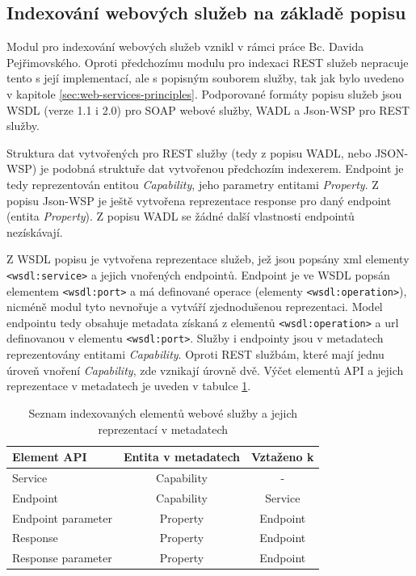 \documentclass[czech,DP]{thesiskiv}
\begin{document}
\subsection{Indexování webových služeb na základě popisu}

Modul pro indexování webových služeb vznikl v rámci práce Bc. Davida Pejřimovského. Oproti předchozímu modulu pro indexaci REST služeb nepracuje tento s její implementací, ale s popisným souborem služby, tak jak bylo uvedeno v kapitole \ref{sec:web-services-principles}. Podporované formáty popisu služeb jsou WSDL (verze 1.1 i 2.0) pro SOAP webové služby, WADL a Json-WSP pro REST služby\cite{pejrimovsky2015ws}.

Struktura dat vytvořených pro REST služby (tedy z popisu WADL, nebo JSON-WSP) je podobná struktuře dat vytvořenou předchozím indexerem. Endpoint je tedy reprezentován entitou \textit{Capability}, jeho parametry entitami \textit{Property}. Z popisu Json-WSP je ještě vytvořena reprezentace response pro daný endpoint (entita \textit{Property}). Z popisu WADL se žádné další vlastnosti endpointů nezískávají.

Z WSDL popisu je vytvořena reprezentace služeb, jež jsou popsány xml elementy \verb|<wsdl:service>| a jejich vnořených endpointů. Endpoint je ve WSDL popsán elementem \verb|<wsdl:port>| a má definované operace (elementy \verb|<wsdl:operation>|), nicméně modul tyto nevnořuje a vytváří zjednodušenou reprezentaci. Model endpointu tedy obsahuje metadata získaná z elementů \verb|<wsdl:operation>| a url definovanou v elementu \verb|<wsdl:port>|. Služby i endpointy jsou v metadatech reprezentovány entitami \textit{Capability}. Oproti REST službám, které mají jednu úroveň vnoření \textit{Capability}, zde vznikají úrovně dvě. Výčet elementů API a jejich reprezentace v metadatech je uveden v tabulce \ref{tab:ws-indexed}.

\begin{table}[h]
	\centering
	\begin{tabular}{|l | c | c |}
		\hline
		Element API & Entita v metadatech & Vztaženo k \\
		\hline
		\hline
		Service & Capability & - \\
		\hline
		Endpoint & Capability & Service \\
		\hline
		Endpoint parameter & Property & Endpoint \\
		\hline
		Response & Property & Endpoint \\
		\hline
		Response parameter & Property & Endpoint \\
		\hline
	\end{tabular}
	\caption{Seznam indexovaných elementů webové služby a jejich reprezentací v metadatech}
	\label{tab:ws-indexed}
\end{table}
\end{document}
